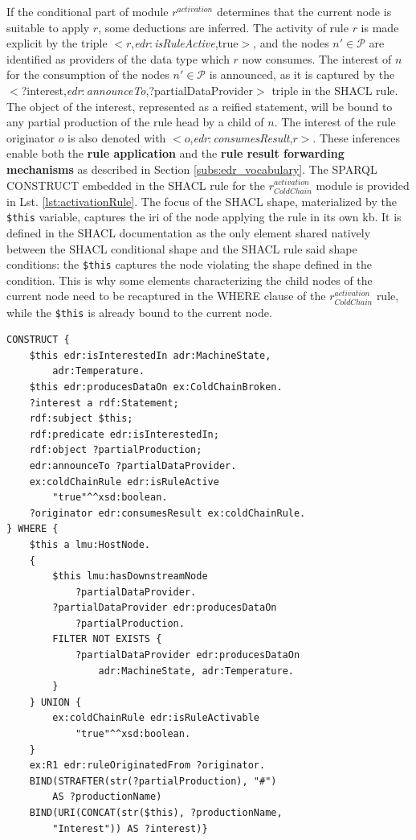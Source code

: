 \documentclass{iosart2c}
\newcommand{\namespace}[1]{\textit{#1$:$}}
\newcommand{\concept}[2]{\namespace{#1}\-\textit{#2}}
\newcommand{\triplet}[3]{$<$#1,\textit{#2},#3$>$}
\begin{document}
If the conditional part of module $r^{activation}$ determines that the current node is suitable to apply $r$, some deductions are inferred. 
The activity of rule $r$ is made explicit by the triple \triplet{$r$}{\concept{edr}{isRuleActive}}{true}, and the nodes $n'\in \mathcal{P}$ are identified as providers of the data type which $r$ now consumes. 
The interest of $n$ for the consumption of the nodes $n'\in \mathcal{P}$ is announced, as it is captured by the \triplet{?interest}{\concept{edr}{announce\-To}}{?partial\-Data\-Provider} triple in the SHACL rule.
The object of the interest, represented as a reified statement, will be bound to any partial production of the rule head by a child of $n$.
The interest of the rule originator $o$ is also denoted with \triplet{$o$}{\concept{edr}{consumes\-Result}}{$r$}.
These inferences enable both the \textbf{rule application} and the \textbf{rule result forwarding mechanisms} as described in Section \textsection \ref{subs:edr_vocabulary}.
The SPARQL CONSTRUCT embedded in the SHACL rule for the $r_{ColdChain}^{activation}$ module is provided in Lst. \ref{lst:activationRule}.
The focus of the SHACL shape, materialized by the \texttt{\$this} variable, captures the \gls{iri} of the node applying the rule in its own \gls{kb}.
It is defined in the SHACL documentation as the only element shared natively between the SHACL conditional shape and the SHACL rule said shape conditions: the \texttt{\$this} captures the node violating the shape defined in the condition. 
This is why some elements characterizing the child nodes of the current node need to be recaptured in the WHERE clause of the $r_{ColdChain}^{activation}$ rule, while the \texttt{\$this} is already bound to the current node.

\begin{lstlisting}[float, caption=$r_{ColdChain}^{activation}$ rule, label=lst:activationRule]
CONSTRUCT {
	$this edr:isInterestedIn adr:MachineState, 
		adr:Temperature.
	$this edr:producesDataOn ex:ColdChainBroken.
	?interest a rdf:Statement;
	rdf:subject $this;
	rdf:predicate edr:isInterestedIn;
	rdf:object ?partialProduction;
	edr:announceTo ?partialDataProvider.
	ex:coldChainRule edr:isRuleActive 
		"true"^^xsd:boolean.
	?originator edr:consumesResult ex:coldChainRule.
} WHERE {
	$this a lmu:HostNode.
	{
		$this lmu:hasDownstreamNode 
			?partialDataProvider.
		?partialDataProvider edr:producesDataOn 
			?partialProduction.
		FILTER NOT EXISTS {
			?partialDataProvider edr:producesDataOn
				adr:MachineState, adr:Temperature.
		}
	} UNION {
		ex:coldChainRule edr:isRuleActivable 
			"true"^^xsd:boolean.
	}
	ex:R1 edr:ruleOriginatedFrom ?originator.
	BIND(STRAFTER(str(?partialProduction), "#") 
		AS ?productionName)
	BIND(URI(CONCAT(str($this), ?productionName, 
		"Interest")) AS ?interest)}
\end{lstlisting}
\end{document}
